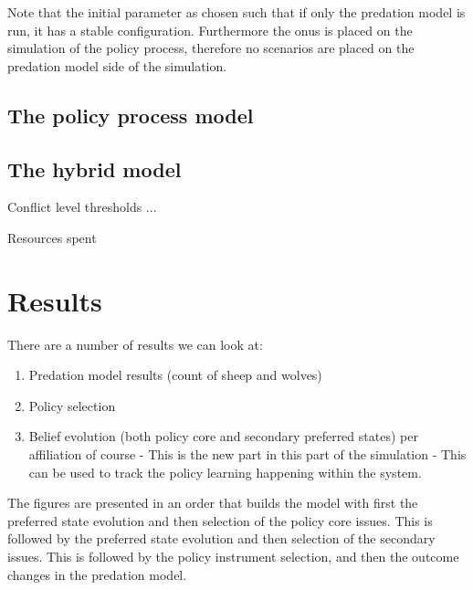\documentclass[12pt]{article}
\begin{document}
Note that the initial parameter as chosen such that if only the predation model is run, it has a stable configuration. Furthermore the onus is placed on the simulation of the policy process, therefore no scenarios are placed on the predation model side of the simulation.


\subsection{The policy process model}

\subsection{The hybrid model}

Conflict level thresholds ...

Resources spent


\section{Results}
\label{sec:}

There are a number of results we can look at:

\begin{enumerate}
\item Predation model results (count of sheep and wolves)
\item Policy selection
\item Belief evolution (both policy core and secondary preferred states) per affiliation of course - This is the new part in this part of the simulation - This can be used to track the policy learning happening within the system.
\end{enumerate}

The figures are presented in an order that builds the model with first the preferred state evolution and then selection of the policy core issues. This is followed by the preferred state evolution and then selection of the secondary issues. This is followed by the policy instrument selection, and then the outcome changes in the predation model.
\end{document}
